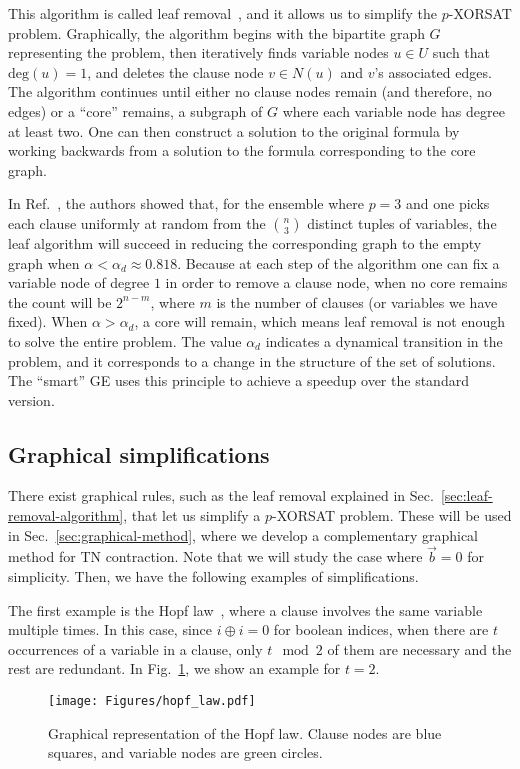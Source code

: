 This algorithm is called leaf removal~\cite{mezard_alternative_2002}, and it allows us to simplify the $p$-XORSAT problem.
Graphically, the algorithm begins with the bipartite graph $G$ representing the problem, then iteratively finds variable nodes $u \in U$ such that $\mathrm{deg}(u) = 1$, and deletes the clause node $v \in N(u)$ and $v$'s associated edges.
The algorithm continues until either no clause nodes remain (and therefore, no edges) or a ``core'' remains, a subgraph of $G$ where each variable node has degree at least two.
One can then construct a solution to the original formula by working backwards from a solution to the formula corresponding to the core graph.

In Ref.~\cite{mezard_alternative_2002}, the authors showed that, for the ensemble where $p = 3$ and one picks each clause uniformly at random from the $\binom{n}{3}$ distinct tuples of variables, the leaf algorithm will succeed in reducing the corresponding graph to the empty graph when $\alpha < \alpha_d \approx 0.818$.
Because at each step of the algorithm one can fix a variable node of degree $1$ in order to remove a clause node, when no core remains the count will be $2^{n-m}$, where $m$ is the number of clauses (or variables we have fixed).
When $\alpha > \alpha_d$, a core will remain, which means leaf removal is not enough to solve the entire problem.
The value $\alpha_d$ indicates a dynamical transition in the problem, and it corresponds to a change in the structure of the set of solutions.
The ``smart'' GE uses this principle to achieve a speedup over the standard version.

\subsection{Graphical simplifications} \label{sec:XORSAT-simplifications}
There exist graphical rules, such as the leaf removal explained in Sec.~\ref{sec:leaf-removal-algorithm}, that let us simplify a $p$-XORSAT problem.
These will be used in Sec.~\ref{sec:graphical-method}, where we develop a complementary graphical method for TN contraction.
Note that we will study the case where $\vec{b} = 0$ for simplicity.
Then, we have the following examples of simplifications.

The first example is the Hopf law~\cite{denny_algebraically_2012}, where a clause involves the same variable multiple times.
In this case, since $i \oplus i = 0$ for boolean indices, when there are $t$ occurrences of a variable in a clause, only $t \mod{2}$ of them are necessary and the rest are redundant.
In Fig.~\ref{fig:hopf_law}, we show an example for $t = 2$.
\begin{figure}[htbp]
    \centering
    \texttt{[image: Figures/hopf\_law.pdf]}
    \caption{\label{fig:hopf_law}Graphical representation of the Hopf law.
    Clause nodes are blue squares, and variable nodes are green circles.}
\end{figure}

